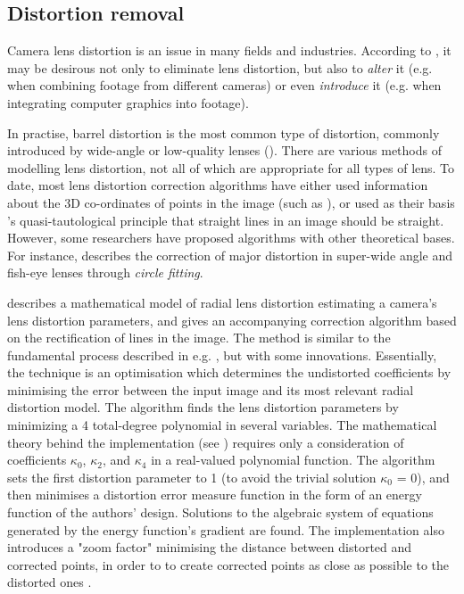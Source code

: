 \subsection{Distortion removal}
\label{sec:distortion-prior}

Camera lens distortion is an issue in many fields and industries. According to \cite{postproduction}, it may be desirous not only to eliminate lens distortion, but also to \emph{alter} it (e.g. when combining footage from different cameras) or even \emph{introduce} it (e.g. when integrating computer graphics into footage).

In practise, barrel distortion is the most common type of distortion, commonly introduced by wide-angle or low-quality lenses (\cite{algebraic-distortion}). There are various methods of modelling lens distortion, not all of which are appropriate for all types of lens. To date, most lens distortion correction algorithms have either used information about the 3D co-ordinates of points in the image (such as \cite{Tsai}), or used as their basis \cite{straightlines}'s quasi-tautological principle that straight lines in an image should be straight. However, some researchers have proposed algorithms with other theoretical bases. For instance, \cite{wide-angle} describes the correction of major distortion in super-wide angle and fish-eye lenses through \emph{circle fitting}.

\cite{algebraic-distortion} describes a mathematical model of radial lens distortion estimating a camera's lens distortion parameters, and gives an accompanying correction algorithm based on the rectification of lines in the image. The method is similar to the fundamental process described in e.g. \cite{straightlines}, but with some innovations. Essentially, the technique is an optimisation which determines the undistorted coefficients by minimising the error between the input image and its most relevant radial distortion model. The algorithm finds the lens distortion parameters by minimizing a 4 total-degree polynomial in several variables. The mathematical theory behind the implementation (see \cite{algebraic-distortion}) requires only a consideration of coefficients $\kappa_{0}$, $\kappa_{2}$, and $\kappa_{4}$ in a real-valued polynomial function. The algorithm sets the first distortion parameter to 1 (to avoid the trivial solution $\kappa_{0}$ = 0), and then minimises a distortion error measure function in the form of an energy function of the authors' design. Solutions to the algebraic system of equations generated by the energy function's gradient are found. The implementation also introduces a "zoom factor" minimising the distance between distorted and corrected points, in order to to create corrected points as close as possible to the distorted ones \cite{algebraic-distortion}.
